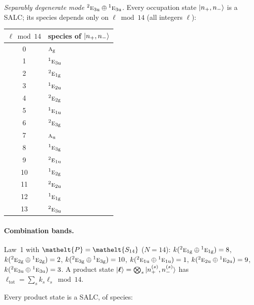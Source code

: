 \documentclass[11pt]{article}
\newcommand{\eltfont}[1]{{\let\sigma\eltsigma\mathelt{#1}}}
\newcommand{\irr}[1]{\text{\normalfont\scshape #1}}
\newcommand{\conjpair}[1]{{}^{#1}}
\newcommand{\elt}[1]{\eltfont{#1}}
\newcommand{\ptag}[1]{\mathrm{#1}}
\newcommand{\pel}{\elt{P}}             %
\begin{document}
\emph{Separably degenerate mode $\conjpair{2}\irr{e}_{3\ptag{u}}\oplus \conjpair{1}\irr{e}_{3\ptag{u}}$.} Every occupation state $\ket{n_+,n_-}$ is a SALC; its species depends only on $\ell\bmod 14$ (all integers $\ell$):
\begin{longtable}{c l}\hline $\ell\bmod 14$ & species of $\ket{n_+,n_-}$\\ \hline\endhead
0 & $\irr{a}_{\ptag{g}}$\\
1 & $\conjpair{1}\irr{e}_{3\ptag{u}}$\\
2 & $\conjpair{2}\irr{e}_{1\ptag{g}}$\\
3 & $\conjpair{1}\irr{e}_{2\ptag{u}}$\\
4 & $\conjpair{2}\irr{e}_{2\ptag{g}}$\\
5 & $\conjpair{1}\irr{e}_{1\ptag{u}}$\\
6 & $\conjpair{2}\irr{e}_{3\ptag{g}}$\\
7 & $\irr{a}_{\ptag{u}}$\\
8 & $\conjpair{1}\irr{e}_{3\ptag{g}}$\\
9 & $\conjpair{2}\irr{e}_{1\ptag{u}}$\\
10 & $\conjpair{1}\irr{e}_{2\ptag{g}}$\\
11 & $\conjpair{2}\irr{e}_{2\ptag{u}}$\\
12 & $\conjpair{1}\irr{e}_{1\ptag{g}}$\\
13 & $\conjpair{2}\irr{e}_{3\ptag{u}}$\\
\hline\end{longtable}

\paragraph{Combination bands.}

Law~1 with $\pel=\elt{S_{14}}$ ($N=14$): $k(\conjpair{2}\irr{e}_{1\ptag{g}}\oplus \conjpair{1}\irr{e}_{1\ptag{g}})=8$, $k(\conjpair{2}\irr{e}_{2\ptag{g}}\oplus \conjpair{1}\irr{e}_{2\ptag{g}})=2$, $k(\conjpair{2}\irr{e}_{3\ptag{g}}\oplus \conjpair{1}\irr{e}_{3\ptag{g}})=10$, $k(\conjpair{2}\irr{e}_{1\ptag{u}}\oplus \conjpair{1}\irr{e}_{1\ptag{u}})=1$, $k(\conjpair{2}\irr{e}_{2\ptag{u}}\oplus \conjpair{1}\irr{e}_{2\ptag{u}})=9$, $k(\conjpair{2}\irr{e}_{3\ptag{u}}\oplus \conjpair{1}\irr{e}_{3\ptag{u}})=3$. A product state $\ket{\boldsymbol\ell}=\bigotimes_s\ket{n_+^{(s)},n_-^{(s)}}$ has $\ell_{\mathrm{tot}}=\sum_sk_s\ell_s\bmod 14$.

Every product state is a SALC, of species:
\end{document}
